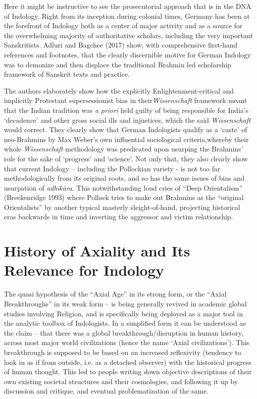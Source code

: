 Here it might be instructive to see the prosecutorial approach that is in the DNA of Indology. Right from its inception during colonial times, Germany has been at the forefront of Indology both as a center of major activity and as a source for the overwhelming majority of authoritative scholars, including the very important Sanskritists. Adluri and Bagchee (2017) show, with comprehensive first-hand references and footnotes, that the clearly discernible motive for German Indology was to demonize and then displace the traditional Brahmin led scholarship framework of Sanskrit texts and practice.

The authors elaborately show how the explicitly Enlightenment-\break critical and implicitly Protestant supersessionist bias in their\break \textit{Wissenschaft} framework meant that the Indian tradition was \textit{a priori} held guilty of being responsible for India’s ‘decadence’ and other gross social ills and injustices, which the said \textit{Wissenschaft} would correct. They clearly show that German Indologists qualify as a ‘caste’ of neo-Brahmins by Max Weber’s own influential sociological criteria,\break whereby their whole \textit{Wissenschaft} methodology was predicated upon usurping the Brahmins’ role for the sake of ‘progress’ and ‘science’. Not only that, they also clearly show that current Indology – including the Pollockian variety - is not too far methodologically from its original roots, and so has the same issues of bias and usurpation of \textit{adhikāra}. This notwithstanding loud cries of “Deep Orientalism” (Breckenridge 1993) where Pollock tries to make out Brahmins as the “original Orientalists” by another typical masterly sleight-of-hand, projecting historical eras backwards in time and inverting the aggressor and victim relationship.


\section*{History of Axiality and Its Relevance for Indology}

The quasi hypothesis of the “Axial Age” in its strong form, or the “Axial Breakthroughs” in its weak form – is being generally revived in academic global studies involving Religion, and is specifically being deployed as a major tool in the analytic toolbox of Indologists. In a simplified form it can be understood as the claim – that there was a global breakthrough/disruption in human history, across most major world civilizations (hence the name ‘Axial civilizations’). This breakthrough is supposed to be based on an increased reflexivity (tendency to look in as if from outside, i.e. as a detached observer) with the historical progress of human thought. This led to people writing down objective descriptions of their own existing societal structures and their cosmologies, and following it up by discussion and critique, and eventual problematization of the same.

